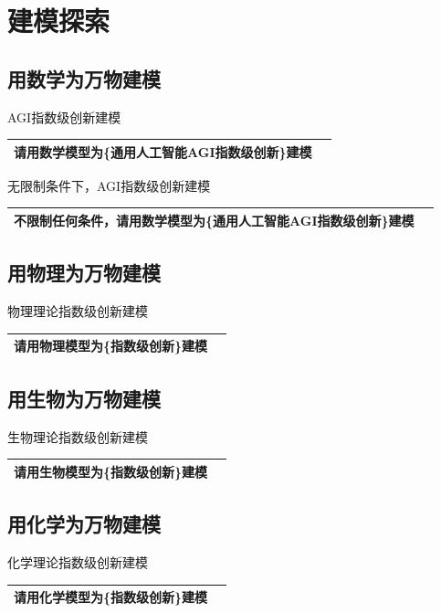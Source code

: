 \documentclass[12pt]{book}
\begin{document}
	
\chapter{建模探索}
\section{用数学为万物建模}

\bigskip
AGI指数级创新建模

\begin{tabular}{|p{15cm}|p{3cm}|}
	\hline
   请用数学模型为\{通用人工智能AGI指数级创新\}建模\\
	\hline
\end{tabular}


\bigskip
无限制条件下，AGI指数级创新建模

\begin{tabular}{|p{15cm}|p{3cm}|}
	\hline
不限制任何条件，请用数学模型为\{通用人工智能AGI指数级创新\}建模\\
	\hline
\end{tabular}

\section{用物理为万物建模}

\bigskip
物理理论指数级创新建模

\begin{tabular}{|p{15cm}|p{3cm}|}
	\hline
 请用物理模型为\{指数级创新\}建模\\
	\hline
\end{tabular}


\section{用生物为万物建模}

\bigskip
生物理论指数级创新建模

\begin{tabular}{|p{15cm}|p{3cm}|}
	\hline
请用生物模型为\{指数级创新\}建模\\
	\hline
\end{tabular}



\section{用化学为万物建模}

\bigskip
化学理论指数级创新建模

\begin{tabular}{|p{15cm}|p{3cm}|}
	\hline
请用化学模型为\{指数级创新\}建模\\
	\hline
\end{tabular}
\end{document}
